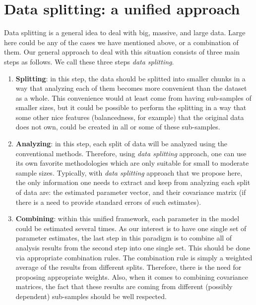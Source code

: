 \documentclass[11pt,a5paper,twoside]{book}
\begin{document}
\section{Data splitting: a unified approach}

Data splitting is a general idea to deal with big, massive, and large data. Large here could be any of the cases we have mentioned above, or a combination of them. Our general approach to deal with this situation consists of three main steps as follows. We call these three steps \textit{data splitting}.

\begin{enumerate}
\item \textbf{Splitting}: in this step, the data should be splitted into smaller chunks in a way that analyzing each of them becomes more convenient than the dataset as a whole. This convenience would at least come from having sub-samples of smaller sizes, but it could be possible to perform the splitting in a way that some other nice features (balancedness, for example) that the original data does not own, could be created in all or some of these sub-samples.

\item \textbf{Analyzing}: in this step, each split of data will be analyzed using the conventional methods. Therefore, using \emph{data splitting} approach, one can use its own favorite methodologies which are only suitable for small to moderate sample sizes. Typically, with \emph{data splitting} approach that we propose here, the only information one needs to extract and keep from analyzing each split of data are: the estimated parameter vector, and their covariance matrix (if there is a need to provide standard errors of such estimates).

\item \textbf{Combining}: within this unified framework, each parameter in the model could be estimated several times. As our interest is to have one single set of parameter estimates, the last step in this paradigm is to combine all of analysis results from the second step into one single set. This should be done via appropriate combination rules. The combination rule is simply a weighted average of the results from different splits. Therefore, there is the need for proposing appropriate weights. Also, when it comes to combining covariance matrices, the fact that these results are coming from different (possibly dependent) sub-samples should be well respected. 

\end{enumerate}
\end{document}
